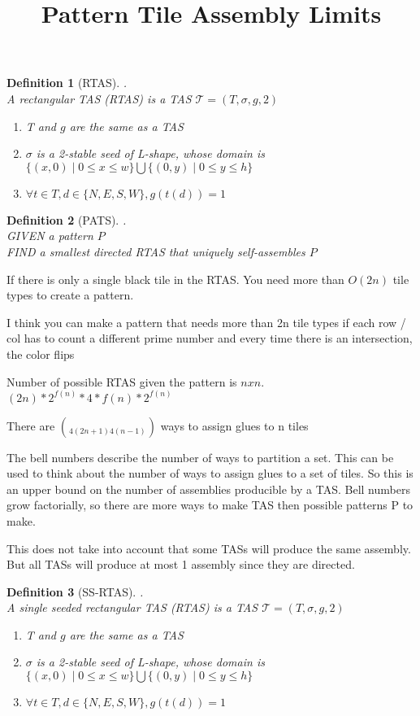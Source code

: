 \documentclass[12pt]{article}
\title{Pattern Tile Assembly Limits}
\newtheorem{definition}{Definition}
\begin{document}
\begin{definition}[RTAS].\\
    A rectangular TAS (RTAS) is a TAS $\mathcal{T} = (T, \sigma, g, 2)$
    \begin{enumerate}
        \item T and $g$ are the same as a TAS
        \item $\sigma$ is a 2-stable seed of L-shape, whose domain is $\{ (x, 0) \mid 0 \le x \le w \} \bigcup \{ (0, y) \mid 0 \le y \le h    \}$
        \item $\forall t \in T, d \in \{N,E,S,W\}, g(t(d)) = 1$
    \end{enumerate}
\end{definition}


\begin{definition}[PATS]. \\
    GIVEN a pattern $P$ \\
    FIND a smallest directed RTAS that uniquely self-assembles $P$
\end{definition}

If there is only a single black tile in the RTAS. You need more than $O(2n)$ tile types to create a pattern. 

I think you can make a pattern that needs more than 2n tile types if each row / col has to count a different prime number and every time there is an intersection, the color flips


Number of possible RTAS given the pattern is $nxn$. $(2n) * 2^{f(n)} * 4 * f(n) * 2^{f(n)}$

There are $\choose{4(2n+1)}{4(n-1)}$ ways to assign glues to n tiles

The bell numbers describe the number of ways to partition a set. This can be used to think about the number of ways to assign glues to a set of tiles. So this is an upper bound on the number of assemblies producible by a TAS. Bell numbers grow factorially, so there are more ways to make TAS then possible patterns P to make.

This does not take into account that some TASs will produce the same assembly. But all TASs will produce at most 1 assembly since they are directed. 




\begin{definition}[SS-RTAS].\\
    A single seeded rectangular TAS (RTAS) is a TAS $\mathcal{T} = (T, \sigma, g, 2)$
    \begin{enumerate}
        \item T and $g$ are the same as a TAS
        \item $\sigma$ is a 2-stable seed of L-shape, whose domain is $\{ (x, 0) \mid 0 \le x \le w \} \bigcup \{ (0, y) \mid 0 \le y \le h    \}$
        \item $\forall t \in T, d \in \{N,E,S,W\}, g(t(d)) = 1$
    \end{enumerate}
\end{definition}
\end{document}
